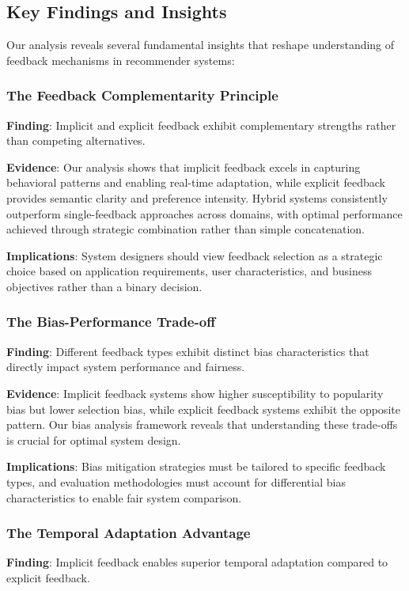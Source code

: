 \subsection{Key Findings and Insights}

Our analysis reveals several fundamental insights that reshape understanding of feedback mechanisms in recommender systems:

\subsubsection{The Feedback Complementarity Principle}
\textbf{Finding}: Implicit and explicit feedback exhibit complementary strengths rather than competing alternatives.

\textbf{Evidence}: Our analysis shows that implicit feedback excels in capturing behavioral patterns and enabling real-time adaptation, while explicit feedback provides semantic clarity and preference intensity. Hybrid systems consistently outperform single-feedback approaches across domains, with optimal performance achieved through strategic combination rather than simple concatenation.

\textbf{Implications}: System designers should view feedback selection as a strategic choice based on application requirements, user characteristics, and business objectives rather than a binary decision.

\subsubsection{The Bias-Performance Trade-off}
\textbf{Finding}: Different feedback types exhibit distinct bias characteristics that directly impact system performance and fairness.

\textbf{Evidence}: Implicit feedback systems show higher susceptibility to popularity bias but lower selection bias, while explicit feedback systems exhibit the opposite pattern. Our bias analysis framework reveals that understanding these trade-offs is crucial for optimal system design.

\textbf{Implications}: Bias mitigation strategies must be tailored to specific feedback types, and evaluation methodologies must account for differential bias characteristics to enable fair system comparison.

\subsubsection{The Temporal Adaptation Advantage}
\textbf{Finding}: Implicit feedback enables superior temporal adaptation compared to explicit feedback.

